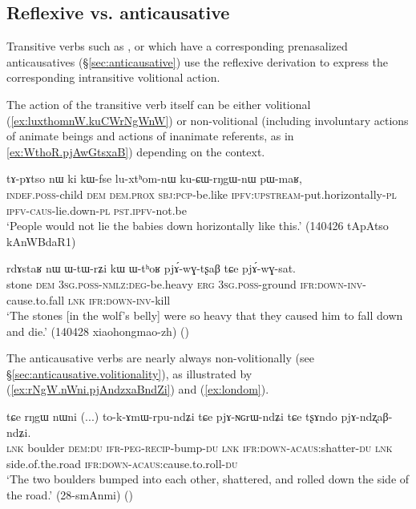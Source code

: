  \subsection{Reflexive vs. anticausative}  \label{sec:refl.acaus}
 
Transitive verbs such as ,  or  which have a corresponding  prenasalized anticausatives (§\ref{sec:anticausative}) use the reflexive derivation to express the corresponding intransitive volitional action. 
 
The action of the transitive verb itself can be either volitional (\ref{ex:luxthomnW.kuCWrNgWnW})  or non-volitional (including involuntary actions of animate beings and actions of inanimate referents, as in \ref{ex:WthoR.pjAwGtsxaB}) depending on the context.
 
 \begin{exe}
\ex \label{ex:luxthomnW.kuCWrNgWnW}
 \gll  tɤ-pɤtso nɯ ki kɯ-fse lu-xtʰom-nɯ ku-ɕɯ-rŋgɯ-nɯ pɯ-maʁ, \\
 \textsc{indef}.\textsc{poss}-child \textsc{dem} \textsc{dem}.\textsc{prox} \textsc{sbj}:\textsc{pcp}-be.like \textsc{ipfv}:\textsc{upstream}-put.horizontally-\textsc{pl} \textsc{ipfv}-\textsc{caus}-lie.down-\textsc{pl} \textsc{pst}.\textsc{ipfv}-not.be \\
\glt `People would not lie the babies down horizontally like this.' (140426 tApAtso kAnWBdaR1)
\end{exe}

 \begin{exe}
\ex \label{ex:WthoR.pjAwGtsxaB}
 \gll  rdɤstaʁ nɯ ɯ-tɯ-rʑi kɯ ɯ-tʰoʁ pjɤ́-wɣ-tʂaβ tɕe pjɤ́-wɣ-sat. \\
 stone \textsc{dem} \textsc{3sg}.\textsc{poss}-\textsc{nmlz}:\textsc{deg}-be.heavy \textsc{erg} \textsc{3sg}.\textsc{poss}-ground \textsc{ifr}:\textsc{down}-\textsc{inv}-cause.to.fall \textsc{lnk} \textsc{ifr}:\textsc{down}-\textsc{inv}-kill \\
\glt `The stones [in the wolf's belly] were so heavy that they caused him to fall down and die.' (140428 xiaohongmao-zh)
()
 \end{exe}
 
 The anticausative verbs are nearly always non-volitionally (see §\ref{sec:anticausative.volitionality}), as illustrated by (\ref{ex:rNgW.nWni.pjAndzxaBndZi}) and (\ref{ex:londom}). 
 
 \begin{exe}
\ex \label{ex:rNgW.nWni.pjAndzxaBndZi}
\gll tɕe rŋgɯ nɯni (...) to-k-ɤmɯ-rpu-ndʑi tɕe pjɤ-ɴɢrɯ-ndʑi tɕe tʂɤndo pjɤ-ndʐaβ-ndʑi. \\
\textsc{lnk} boulder \textsc{dem}:\textsc{du} {  } \textsc{ifr}-\textsc{peg}-\textsc{recip}-bump-\textsc{du} \textsc{lnk} \textsc{ifr}:\textsc{down}-\textsc{acaus}:shatter-\textsc{du} \textsc{lnk} side.of.the.road \textsc{ifr}:\textsc{down}-\textsc{acaus}:cause.to.roll-\textsc{du} \\
\glt `The two boulders bumped into each other, shattered, and rolled down the side of the road.' (28-smAnmi) 	()
 \end{exe}

